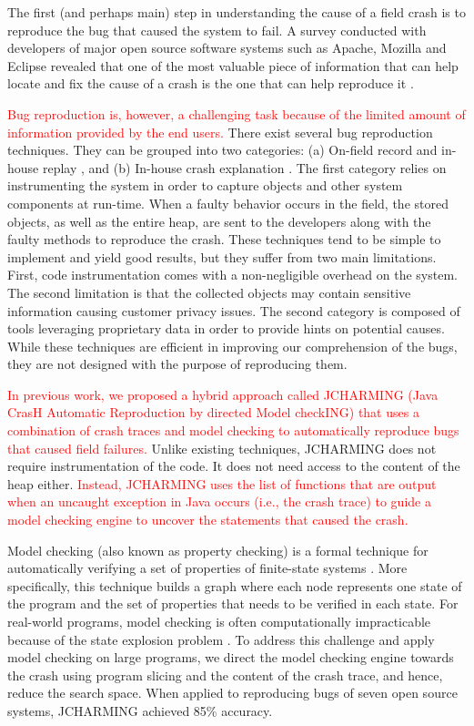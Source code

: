 \documentclass[times, doublespace]{smrauth}
\newcommand{\red}[1]{\textcolor{red}{#1}}
\begin{document}
The first (and perhaps main) step in understanding the cause of a field crash is to reproduce the bug that caused the system to fail. A survey conducted with developers of major open source software systems such as Apache, Mozilla and Eclipse revealed that
one of the most valuable piece of information that can help
locate and fix the cause of a crash is the one that can help
reproduce it \cite{Bettenburg2008}.

\red{Bug reproduction is, however, a challenging task because of the limited amount of information  provided by the end users.} There exist several bug reproduction techniques. They can be grouped into two categories: (a)
On-field record and in-house replay \cite{Narayanasamy2005,Artzi2008,Jaygarl}, and (b) In-house crash explanation \cite{Manevich2004,chandra2009snugglebug}. The first category relies on
instrumenting the system in order to capture objects and other
system components at run-time. When a faulty behavior
occurs in the field, the stored objects, as well as the entire heap,
are sent to the developers along with the faulty methods to
reproduce the crash. These techniques tend to be simple to
implement and yield good results, but they suffer from two
main limitations. First, code instrumentation comes with a
non-negligible overhead on the system. The second limitation
is that the collected objects may contain sensitive information
causing customer privacy issues. The second category is
composed of tools leveraging proprietary data in order to
provide hints on potential causes. While these techniques are
efficient in improving our comprehension of the bugs, they are
not designed with the purpose of reproducing them.

\red{In previous work, we proposed a hybrid approach called JCHARMING
(Java CrasH Automatic Reproduction by directed Model
checkING) \cite{Nayrolles2015} that uses a combination of crash traces and model
checking to automatically reproduce bugs that caused field
failures.} Unlike existing techniques, JCHARMING does not
require instrumentation of the code. It does not need access to
the content of the heap either. \red{Instead, JCHARMING uses the list of functions that are output when an uncaught exception in Java
occurs (i.e., the crash trace) to guide a model checking engine
to uncover the statements that caused the crash.}

Model checking (also known as property checking) is a formal
technique for automatically verifying a set of properties of
finite-state systems \cite{Baier2008}. More specifically, this technique
builds a graph where each node represents one
state of the program and the set of properties that needs to be
verified in each state. For real-world programs, model
checking is often computationally impracticable because of
the state explosion problem \cite{Baier2008}. To address this challenge and
apply model checking on large programs, we direct the model
checking engine towards the crash using program slicing and
the content of the crash trace, and hence, reduce the search
space. When applied to reproducing bugs of seven open source  systems, JCHARMING achieved
 85\% accuracy.
\end{document}
